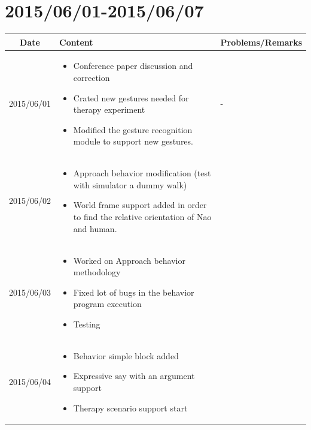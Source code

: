 \documentclass[11pt]{article} %
\begin{document}
\newpage
\section{2015/06/01-2015/06/07}

\begin{center}
    \begin{longtable}{ | c | p{6cm} | p{5cm} |}
    \hline
    Date & Content & Problems/Remarks \\ 
    \endhead
    \hline    
     2015/06/01         & 
  	\begin{itemize}
  	\item Conference paper discussion and correction
  	\item Crated new gestures needed for therapy experiment
  	\item Modified the gesture recognition module to support new gestures.
	\end{itemize}  
   & - \\
\hline
  										 
 2015/06/02         & 
  \begin{itemize}
  \item Approach behavior modification (test with simulator a dummy walk)
  \item World frame support added in order to find the relative orientation of Nao and human.
\end{itemize}   
& 
 \\
\hline
  										 
  
  2015/06/03        & 
  \begin{itemize}
  \item Worked on Approach behavior methodology
  \item Fixed lot of bugs in the behavior program execution
  \item Testing
  \end{itemize}   
  										 & 
 
  										 \\
  \hline
  
  2015/06/04         & 
  \begin{itemize}
  \item Behavior simple block added
  \item Expressive say with an argument support
  \item Therapy scenario support start
  \end{itemize}
  & 
\\  										 \hline


\end{longtable}
\end{center}
\end{document}
